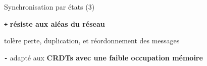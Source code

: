 \begin{frame}{Synchronisation par états (3)}
\begin{minipage}[c][.55\textheight][t]{\textwidth}
    \end{minipage}
    \begin{minipage}{\textwidth}
        \begin{compactitemize}
            \item[\color{valid} \textbf{\texttt{+}}] \textbf{résiste aux aléas du réseau}
            \begin{compactitemize}
                \item tolère perte, duplication, et réordonnement des messages
            \end{compactitemize}
            \item[\color{invalid} \textbf{\texttt{-}}] adapté aux \textbf{CRDTs avec une faible occupation mémoire}
        \end{compactitemize}
    \end{minipage}
\end{frame}


